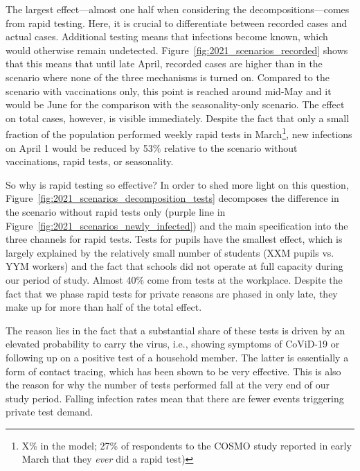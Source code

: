 The largest effect---almost one half when considering the decompositions---comes from
rapid testing. Here, it is crucial to differentiate between recorded cases and actual
cases. Additional testing means that infections become known, which would otherwise
remain undetected. Figure~\ref{fig:2021_scenarios_recorded} shows that this means that
until late April, recorded cases are higher than in the scenario where none of the three
mechanisms is turned on. Compared to the scenario with vaccinations only, this point is
reached around mid-May and it would be June for the comparison with the seasonality-only
scenario. The effect on total cases, however, is visible immediately. Despite the fact
that only a small fraction of the population performed weekly rapid tests in
March\footnote{X\% in the model; 27\% of respondents to the COSMO study reported in
    early March that they \textit{ever} did a rapid test)}, new
infections on April 1 would be reduced by 53\% relative to the scenario without
vaccinations, rapid tests, or seasonality.

So why is rapid testing so effective? In order to shed more light on this question,
Figure~\ref{fig:2021_scenarios_decomposition_tests} decomposes the difference in the
scenario without rapid tests only (purple line in
Figure~\ref{fig:2021_scenarios_newly_infected}) and the main specification into the
three channels for rapid tests. Tests for pupils have the smallest effect, which is
largely explained by the relatively small number of students (XXM pupils vs. YYM
workers) and the fact that schools did not operate at full
capacity during our period of study. Almost 40\% come from tests at the workplace.
Despite the fact that we phase rapid tests for private reasons are phased in only late,
they make up for more than half of the total effect.


The reason lies in the fact that a substantial share of these tests is driven by an
elevated probability to carry the virus, i.e., showing symptoms of CoViD-19 or following
up on a positive test of a household member. The latter is essentially a form of contact
tracing, which has been shown to be very effective. This is also the reason for why the number of tests performed fall at
the very end of our study period. Falling infection rates mean that there are fewer
events triggering private test demand.

